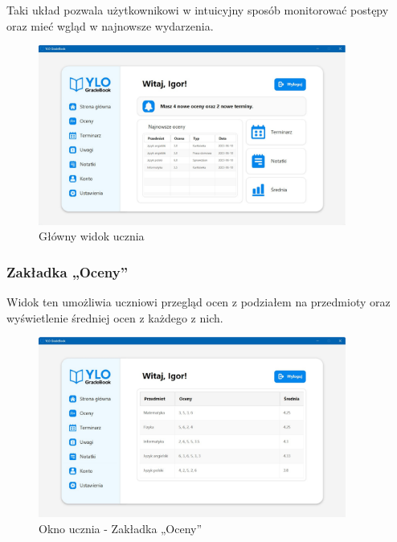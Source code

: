Taki układ pozwala użytkownikowi w intuicyjny sposób monitorować postępy oraz mieć wgląd w najnowsze wydarzenia.

\begin{figure}[H]
    \centering
    \includegraphics[width=0.9\textwidth]{figures/fig_0007.eps}
    \caption{Główny widok ucznia}
    \label{fig:studentWindow}
\end{figure}
\newpage
\subsubsection{Zakładka „Oceny”}
Widok ten umożliwia uczniowi przegląd ocen z podziałem na przedmioty oraz wyświetlenie średniej ocen z każdego z nich.
\begin{figure}[H]
    \centering
    \includegraphics[width=0.9\textwidth]{figures/StudentWindow/fig_0009.eps}
    \caption{Okno ucznia - Zakładka „Oceny”}
    \label{fig:studentGradePane}
\end{figure}


